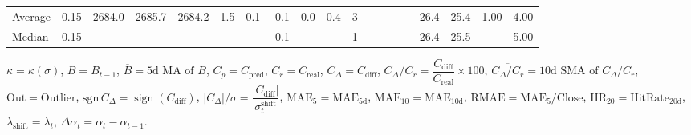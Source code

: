 \begin{threeparttable}
{\begin{tabular}{lrrrrrrrrrrrrrrrrr}
Average &     0.15 & 2684.0 & 2685.7 & 2684.2 &        1.5 &            0.1 &                      -0.1 &                      0.0 &                 0.4 &              3 &         -- &        -- &             -- &             26.4 &                25.4 &            1.00 &                   4.00 \\
 Median &     0.15 &     -- &     -- &     -- &         -- &             -- &                      -0.1 &                       -- &                  -- &              1 &         -- &        -- &             -- &             26.4 &                25.5 &              -- &                   5.00 \\
\bottomrule
\end{tabular}
}
\begin{tablenotes}\footnotesize
\item $\kappa=\kappa(\sigma)$, $B=B_{t-1}$, $\overline{B}=\text{5d MA of }B$, $C_p=C_{\text{pred}}$, $C_r=C_{\text{real}}$, $C_\Delta=C_{\text{diff}}$, $C_\Delta/C_r=\dfrac{C_{\text{diff}}}{C_{\text{real}}}\times100$, $\overline{C_\Delta/C_r}=\text{10d SMA of }C_\Delta/C_r$, $\mathrm{Out}=\text{Outlier}$, $\mathrm{sgn}\,C_\Delta=\operatorname{sign}(C_{\text{diff}})$, $|C_\Delta|/\sigma=\dfrac{|C_{\text{diff}}|}{\sigma_t^{\text{shift}}}$, $\mathrm{MAE}_5=\mathrm{MAE}_{5\text{d}}$, $\mathrm{MAE}_{10}=\mathrm{MAE}_{10\text{d}}$, $\mathrm{RMAE}= \mathrm{MAE}_5 / \text{Close}$, $\mathrm{HR}_{20}=\mathrm{HitRate}_{20\text{d}}$, $\lambda_{\text{shift}}=\lambda_t$, $\Delta\alpha_t=\alpha_t-\alpha_{t-1}$.
\end{tablenotes}
\end{threeparttable}
\endgroup

